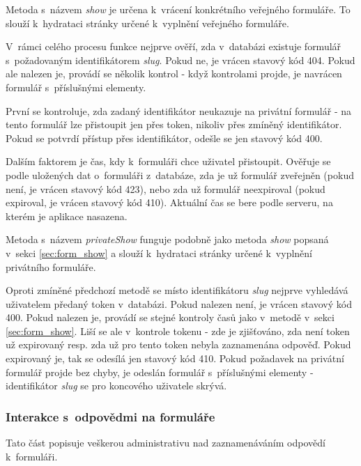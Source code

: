 			\label{sec:form_show}
			Metoda s~názvem \textit{show} je určena k~vrácení konkrétního veřejného formuláře. To slouží k~hydrataci stránky určené k~vyplnění veřejného formuláře.
			
			V~rámci celého procesu funkce nejprve ověří, zda v~databázi existuje formulář s~požadovaným identifikátorem \textit{slug}. Pokud ne, je vrácen stavový kód 404. Pokud ale nalezen je, provádí se několik kontrol - když kontrolami projde, je navrácen formulář s~příslušnými elementy.
			
			První se kontroluje, zda zadaný identifikátor neukazuje na privátní formulář - na tento formulář lze přistoupit jen přes token, nikoliv přes zmíněný identifikátor. Pokud se potvrdí přístup přes identifikátor, odešle se jen stavový kód 400.
			
			Dalším faktorem je čas, kdy k~formuláři chce uživatel přistoupit. Ověřuje se podle uložených dat o~formuláři z~databáze, zda je už formulář zveřejněn (pokud není, je vrácen stavový kód 423), nebo zda už formulář neexpiroval (pokud expiroval, je vrácen stavový kód 410). Aktuální čas se bere podle serveru, na kterém je aplikace nasazena.
			
			\label{sec:form_privateshow}
			Metoda s~názvem \textit{privateShow} funguje podobně jako metoda \textit{show} popsaná v~sekci \ref{sec:form_show} a slouží k~hydrataci stránky určené k~vyplnění privátního formuláře. 
			
			Oproti zmíněné předchozí metodě se místo identifikátoru \textit{slug} nejprve vyhledává uživatelem předaný token v~databázi. Pokud nalezen není, je vrácen stavový kód 400. Pokud nalezen je, provádí se stejné kontroly časů jako v~metodě v~sekci \ref{sec:form_show}. Liší se ale v~kontrole tokenu - zde je zjišťováno, zda není token už expirovaný resp. zda už pro tento token nebyla zaznamenána odpověď. Pokud expirovaný je, tak se odesílá jen stavový kód 410. Pokud požadavek na privátní formulář projde bez chyby, je odeslán formulář s~příslušnými elementy - identifikátor \textit{slug} se pro koncového uživatele skrývá.
 
		\subsubsection{Interakce s~odpovědmi na formuláře}
		Tato část popisuje veškerou administrativu nad zaznamenáváním odpovědí k~formuláři.
		
